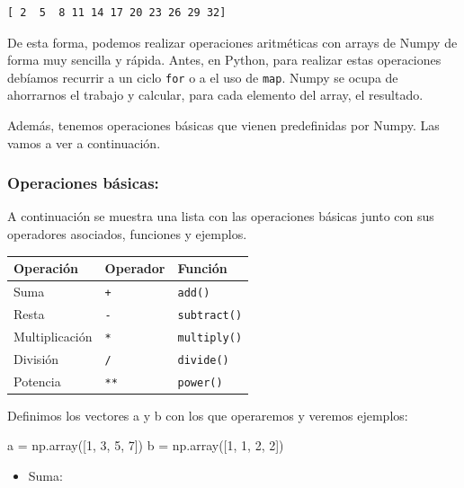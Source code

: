 \documentclass[
  letterpaper,
  DIV=11,
  numbers=noendperiod]{scrreprt}
\newenvironment{Shaded}{\begin{snugshade}}{\end{snugshade}}
\newcommand{\DecValTok}[1]{\textcolor[rgb]{0.68,0.00,0.00}{#1}}
\newcommand{\NormalTok}[1]{\textcolor[rgb]{0.00,0.23,0.31}{#1}}
\newcommand{\OperatorTok}[1]{\textcolor[rgb]{0.37,0.37,0.37}{#1}}
\providecommand{\tightlist}{%
  \setlength{\itemsep}{0pt}\setlength{\parskip}{0pt}}\usepackage{longtable,booktabs,array}
\begin{document}
\begin{verbatim}
[ 2  5  8 11 14 17 20 23 26 29 32]
\end{verbatim}

De esta forma, podemos realizar operaciones aritméticas con arrays de
Numpy de forma muy sencilla y rápida. Antes, en Python, para realizar
estas operaciones debíamos recurrir a un ciclo \texttt{for} o a el uso
de \texttt{map}. Numpy se ocupa de ahorrarnos el trabajo y calcular,
para cada elemento del array, el resultado.

Además, tenemos operaciones básicas que vienen predefinidas por Numpy.
Las vamos a ver a continuación.

\subsubsection{Operaciones básicas:}\label{operaciones-buxe1sicas}

A continuación se muestra una lista con las operaciones básicas junto
con sus operadores asociados, funciones y ejemplos.

\begin{longtable}[]{@{}lll@{}}
\toprule\noalign{}
Operación & Operador & Función \\
\midrule\noalign{}
\endhead
\bottomrule\noalign{}
\endlastfoot
Suma & \texttt{+} & \texttt{add()} \\
Resta & \texttt{-} & \texttt{subtract()} \\
Multiplicación & \texttt{*} & \texttt{multiply()} \\
División & \texttt{/} & \texttt{divide()} \\
Potencia & \texttt{**} & \texttt{power()} \\
\end{longtable}

Definimos los vectores a y b con los que operaremos y veremos ejemplos:

\begin{Shaded}
\begin{Highlighting}[]
\NormalTok{a }\OperatorTok{=}\NormalTok{ np.array([}\DecValTok{1}\NormalTok{, }\DecValTok{3}\NormalTok{, }\DecValTok{5}\NormalTok{, }\DecValTok{7}\NormalTok{])}
\NormalTok{b }\OperatorTok{=}\NormalTok{ np.array([}\DecValTok{1}\NormalTok{, }\DecValTok{1}\NormalTok{, }\DecValTok{2}\NormalTok{, }\DecValTok{2}\NormalTok{])}
\end{Highlighting}
\end{Shaded}

\begin{itemize}
\tightlist
\item
  Suma:
\end{itemize}
\end{document}
